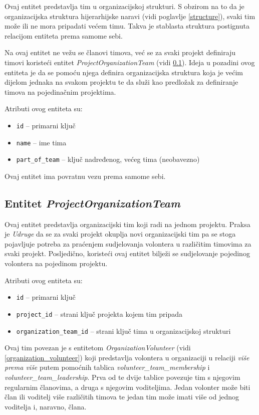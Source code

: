 \documentclass[times, utf8, diplomski]{fer}
\begin{document}
Ovaj entitet predstavlja tim u organizacijskoj strukturi. S obzirom na to da je
organizacijska struktura hijerarhijske naravi (vidi poglavlje \ref{structure}),
svaki tim može ili ne mora pripadati većem timu. Takva je stablasta struktura
postignuta relacijom entiteta prema samome sebi.

Na ovaj entitet ne vežu se članovi timova, već se za svaki projekt definiraju
timovi koristeći entitet \emph{ProjectOrganizationTeam} (vidi
\ref{project_organization_team}). Ideja u pozadini ovog entiteta je da se pomoću
njega definira organizacijska struktura koja je većim dijelom jednaka na svakom
projektu te da služi kao predložak za definiranje timova na pojedinačnim
projektima.


\medskip
Atributi ovog entiteta su:
\begin{itemize}
    \item \texttt{id} -- primarni ključ
    \item \texttt{name} -- ime tima
    \item \texttt{part\_of\_team} -- ključ nadređenog, većeg tima (neobavezno)
\end{itemize}

Ovaj entitet ima povratnu vezu prema samome sebi.

\subsection{Entitet \emph{ProjectOrganizationTeam}}
\label{project_organization_team}

Ovaj entitet predstavlja organizacijski tim koji radi na jednom projektu. Praksa
je \emph{Udruge} da se za svaki projekt okuplja novi organizacijski tim pa se
stoga pojavljuje potreba za praćenjem sudjelovanja volontera u različitim
timovima za svaki projekt. Posljedično, koristeći ovaj entitet bilježi se
sudjelovanje pojedinog volontera na pojedinom projektu.

\medskip
Atributi ovog entiteta su:
\begin{itemize}
    \item \texttt{id} -- primarni ključ
    \item \texttt{project\_id} -- strani ključ projekta kojem tim pripada
    \item \texttt{organization\_team\_id} -- strani ključ tima u organizacijskoj
        strukturi
\end{itemize}

Ovaj tim povezan je s entitetom \emph{OrganizationVolunteer} (vidi
\ref{organization_volunteer}) koji predstavlja volontera u organizaciji u
relaciji \emph{više prema više} putem pomoćnih tablica
\emph{volunteer\_team\_membership} i \emph{volunteer\_team\_leadership}. Prva od
te dvije tablice povezuje tim s njegovim regularnim članovima, a druga s
njegovim voditeljima. Jedan volonter može biti član ili voditelj više različitih
timova te jedan tim može imati više od jednog voditelja i, naravno, člana.
\end{document}
